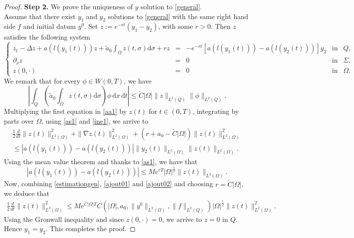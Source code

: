 \documentclass[reqno,twoside]{amsart}
\numberwithin{equation}{section}
\theoremstyle{definition}
\numberwithin{equation}{section}
\def \dis {\displaystyle}
\def \dq {\mathrm{d}x \, \mathrm{d}t}
\def \d {\mathrm{d}}
\begin{document}
\begin{proof}
	\noindent \textbf{Step 2.} We prove the uniqueness of $y$ solution to \eqref{general}.\\
	Assume that there exist $y_1$ and $y_2$ solutions to \eqref{general} with the same right hand side $f$ and initial datum $y^0$.  Set $z:=e^{-rt}(y_1-y_2)$, with some $r>0$. Then  $z$ satisfies the following system
	\begin{equation}\label{aa1}
		\left\{
		\begin{array}{rllll}
			\dis z_{t}-\Delta z+a\left(l(y_1(t))\right)z+\tilde{a}_0\int_{\Omega}z(t,\sigma)\d\sigma +rz &=&-e^{-rt}\left[ a\left(l(y_1(t))\right)-a\left(l(y_2(t))\right)\right]y_2& \mbox{in}& Q,\\
			\dis  \partial_\nu z&=&0& \mbox{in}& \Sigma, \\
			\dis  z(0,\cdot)&=&0 &\mbox{in}&\Omega.
		\end{array}
		\right.
	\end{equation}
	We remark that for every $\phi\in W(0,T)$, we have
	\begin{equation}\label{ine1}
		\left|\int_Q\left(\tilde{a}_0 \dis \int_{\Omega}z(t,\sigma)\d\sigma\right)\phi\, \dq\right|\leq \tilde{C}|\Omega|\|z\|_{L^2(Q)}\|\phi\|_{L^2(Q)}.
	\end{equation}
	Multiplying the first equation in \eqref{aa1} by $z(t)$ for $t\in (0,T)$, integrating by parts over $\Omega$, using \eqref{as1} and \eqref{ine1}, we arrive to
	\begin{equation}\label{ajout01}
		\begin{array}{rllll}
			\dis \frac{1}{2}\frac{d}{dt}\|z(t)\|^2_{L^2(\Omega)}+\|\nabla z(t)\|^2_{L^2(\Omega)}+ (r+a_0-\tilde{C}|\Omega|)\|z(t)\|^2_{L^2(\Omega)} \\
			\leq\left| a\left(l(y_1(t))\right)-a\left(l(y_2(t))\right)\right|\|y_2(t)\|_{L^2(\Omega)}\|z(t)\|_{L^2(\Omega)}.
		\end{array}
	\end{equation}
	Using the mean value theorem and thanks to  \eqref{as1}, we have that
	\begin{equation}\label{ajout02}
		\left| a\left(l(y_1(t))\right)-a\left(l(y_2(t))\right)\right|\leq Me^{rT}|\Omega|^{\frac{1}{2}}\|z(t)\|_{L^2(\Omega)}.
	\end{equation}
	Now, combining \eqref{estimationgen}, \eqref{ajout01} and \eqref{ajout02} and choosing $r=\tilde{C}|\Omega|$, we deduce that
	\begin{equation}\label{ajout03}
		\begin{array}{rllll}
			\dis \frac{1}{2}\frac{d}{dt}\|z(t)\|^2_{L^2(\Omega)}\leq  Me^{\tilde{C}|\Omega|T}C(|\Omega|,a_0,\|y^0\|_{L^2(\Omega)}, \|f\|_{L^2(Q)})|\Omega|^{\frac{1}{2}}\|z(t)\|^2_{L^2(\Omega)}.
		\end{array}
	\end{equation}
	Using the Gronwall inequality and since $z(0,\cdot)=0$, we arrive to $z=0$ in $Q$. Hence $y_1=y_2$. This completes the proof.
\end{proof}
\end{document}
